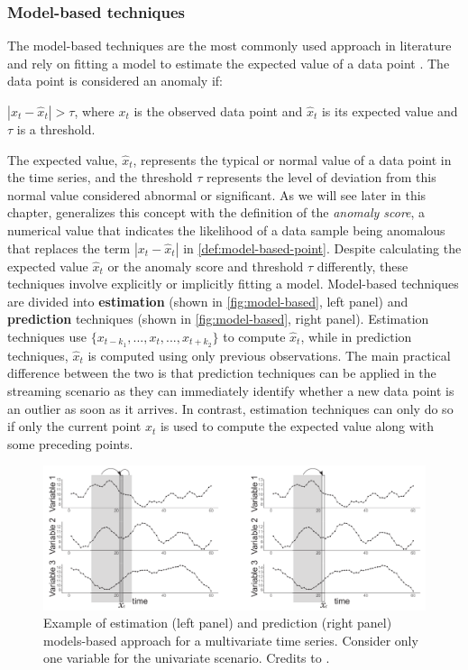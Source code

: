 \subsubsection{Model-based techniques}
\label{ss:model-based}
The model-based techniques are the most commonly used approach in literature and rely on fitting a model to estimate the expected value of a data point \cite{blazquez2020review}. The data point is considered an anomaly if: 
\begin{definition}\label{def:model-based-point}
    $|x_t - \hat{x}_t| > \tau $, where $x_t$ is the observed data point and $\hat{x}_t$ is its expected value and $\tau$ is a threshold.
\end{definition}
The expected value, $\hat{x}_t$, represents the typical or normal value of a data point in the time series, and the threshold $\tau$ represents the level of deviation from this normal value considered abnormal or significant. As we will see later in this chapter, \cite{choi2021deep} generalizes this concept with the definition of the \textit{anomaly score}, a numerical value that indicates the likelihood of a data sample being anomalous that replaces the term $|x_t - \hat{x}_t|$ in \autoref{def:model-based-point}. Despite calculating the expected value $\hat{x}_t$ or the anomaly score and threshold $\tau$ differently, these techniques involve explicitly or implicitly fitting a model. Model-based techniques are divided into \textbf{estimation} (shown in \autoref{fig:model-based}, left panel) and \textbf{prediction} techniques (shown in \autoref{fig:model-based}, right panel). Estimation techniques use $\{x_{t-k_1},...,x_t,...,x_{t+k_2}\}$ to compute $\hat{x}_t$, while in prediction techniques, $\hat{x}_t$ is computed using only previous observations. The main practical difference between the two is that prediction techniques can be applied in the streaming scenario as they can immediately identify whether a new data point is an outlier as soon as it arrives. In contrast, estimation techniques can only do so if only the current point $x_t$ is used to compute the expected value along with some preceding points. 
\begin{figure}[t]
\centering
\includegraphics[width=1\linewidth]{figures/introduction-2/model-based.png}
\caption{Example of estimation (left panel) and prediction (right panel) models-based approach for a multivariate time series. Consider only one variable for the univariate scenario. Credits to \cite{blazquez2020review}.}
\label{fig:model-based}
\end{figure}


